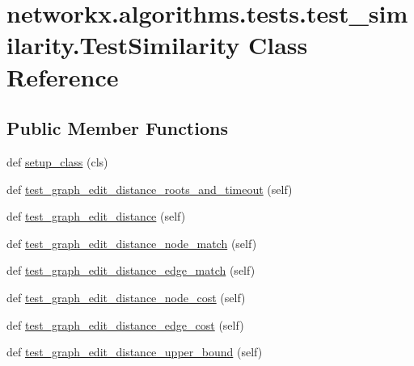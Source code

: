 \hypertarget{classnetworkx_1_1algorithms_1_1tests_1_1test__similarity_1_1TestSimilarity}{}\section{networkx.\+algorithms.\+tests.\+test\+\_\+similarity.\+Test\+Similarity Class Reference}
\label{classnetworkx_1_1algorithms_1_1tests_1_1test__similarity_1_1TestSimilarity}
\subsection*{Public Member Functions}
\begin{DoxyCompactItemize}
\item 
def \hyperlink{classnetworkx_1_1algorithms_1_1tests_1_1test__similarity_1_1TestSimilarity_aae61f22e17879ffbc5002af51d3a51ba}{setup\+\_\+class} (cls)
\item 
def \hyperlink{classnetworkx_1_1algorithms_1_1tests_1_1test__similarity_1_1TestSimilarity_a0de722880584971829c2b5fd8d54242a}{test\+\_\+graph\+\_\+edit\+\_\+distance\+\_\+roots\+\_\+and\+\_\+timeout} (self)
\item 
def \hyperlink{classnetworkx_1_1algorithms_1_1tests_1_1test__similarity_1_1TestSimilarity_a093f7f38379c973b0a80ec67141f0e59}{test\+\_\+graph\+\_\+edit\+\_\+distance} (self)
\item 
def \hyperlink{classnetworkx_1_1algorithms_1_1tests_1_1test__similarity_1_1TestSimilarity_ace1ed351a483c9ea46e606670a8b36d3}{test\+\_\+graph\+\_\+edit\+\_\+distance\+\_\+node\+\_\+match} (self)
\item 
def \hyperlink{classnetworkx_1_1algorithms_1_1tests_1_1test__similarity_1_1TestSimilarity_ae94a1beadb79143f0224ee2ab9e6284b}{test\+\_\+graph\+\_\+edit\+\_\+distance\+\_\+edge\+\_\+match} (self)
\item 
def \hyperlink{classnetworkx_1_1algorithms_1_1tests_1_1test__similarity_1_1TestSimilarity_ad5f534b231920eb0f8960a1d301f7afa}{test\+\_\+graph\+\_\+edit\+\_\+distance\+\_\+node\+\_\+cost} (self)
\item 
def \hyperlink{classnetworkx_1_1algorithms_1_1tests_1_1test__similarity_1_1TestSimilarity_a7715c52d68a648d307d45ed17c12dde1}{test\+\_\+graph\+\_\+edit\+\_\+distance\+\_\+edge\+\_\+cost} (self)
\item 
def \hyperlink{classnetworkx_1_1algorithms_1_1tests_1_1test__similarity_1_1TestSimilarity_a4b0e29f8420ae5f7d4413cb6264140e3}{test\+\_\+graph\+\_\+edit\+\_\+distance\+\_\+upper\+\_\+bound} (self)

\end{DoxyCompactItemize}
